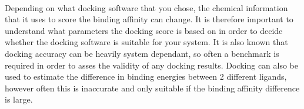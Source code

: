     \paragraph{}
        Depending on what docking software that you chose, the chemical information that it uses to score the binding affinity can change. It is therefore important to understand what parameters the docking score is based on in order to decide whether the docking software is suitable for your system. It is also known that docking accuracy can be heavily system dependant, so often a benchmark is required in order to asses the validity of any docking results. Docking can also be used to estimate the difference in binding energies between 2 different ligands, however often this is inaccurate and only suitable if the binding affinity difference is large.

        